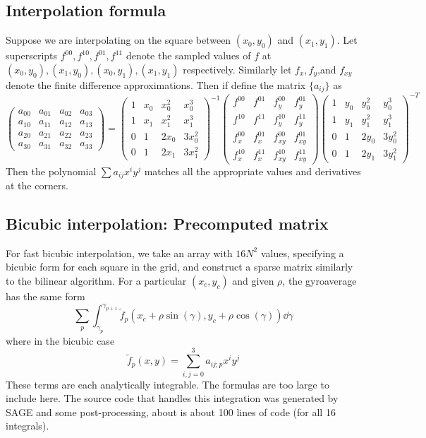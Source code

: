 \subsection{Interpolation formula}
Suppose we are interpolating on the square between $(x_0,y_0)$ and $(x_1,y_1)$.  Let superscripts $f^{00}, f^{10}, f ^{01}, f^{11}$ denote the sampled values of $f$ at $(x_0,y_0), (x_1,y_0), (x_0,y_1), (x_1,y_1)$ respectively.  Similarly let $f_x,f_y$,and $f_{xy}$ denote the finite difference approximations.  Then if define the matrix $ \{a_{ij}\}$ as
\[  \begin{pmatrix}
	a_{00} & a_{01} & a_{02} & a_{03} \\
	a_{10} & a_{11} & a_{12} & a_{13} \\
	a_{20} & a_{21} & a_{22} & a_{23} \\
	a_{30} & a_{31} & a_{32} & a_{33} 
\end{pmatrix}  = 
\begin{pmatrix}
	1 & x_0 & x_0^2 & x_0^3 \\
	1 & x_1 & x_1^2 & x_1^3 \\
0 & 1& 2x_0 &3x_0^2 \\
	0 & 1& 2x_1 &3x_1^2 
\end{pmatrix}^{-1}
\begin{pmatrix}
	f^{00} & f^{01} & f_y^{00} & f_y^{01} \\
	f^{10} & f^{11} & f_y^{10} & f_y^{11} \\
	f_x^{00} & f_x^{01} & f_{xy}^{00} & f_{xy}^{01} \\
	f_x^{10} & f_x^{11} & f_{xy}^{10} & f_{xy}^{11} 
\end{pmatrix}
\begin{pmatrix}
	1 & y_0 & y_0^2 & y_0^3 \\
	1 & y_1 & y_1^2 & y_1^3 \\
	0 & 1& 2y_0 &3y_0^2 \\
	0 & 1& 2y_1 &3y_1^2 
\end{pmatrix}^{-T}
\]
Then the polynomial $\sum a_{ij} x^i y^j$ matches all the appropriate values and derivatives at the corners.
\subsection{Bicubic interpolation: Precomputed matrix}
For fast bicubic interpolation, we take an array with $16N^2$ values, specifying a bicubic form for each square in the grid, and construct a sparse matrix similarly to the bilinear algorithm.  For a particular $(x_c,y_c)$ and given $\rho$, the gyroaverage has the same form \[  \sum_{p}\int_{\gamma_p}^{\gamma_{p+1}} \tilde{f}_p(x_c+\rho \sin(\gamma), y_c + \rho \cos(\gamma)) \dd{\gamma}\]
where in the bicubic case 
\[ \tilde{f}_p(x,y) = \sum_{i,j=0}^3 a_{ij;p} x^i y^j \]
These terms are each analytically integrable.  The formulas are too large to include here. The source code that handles this integration was generated by SAGE and some post-processing, about is about 100 lines of code (for all 16 integrals).

